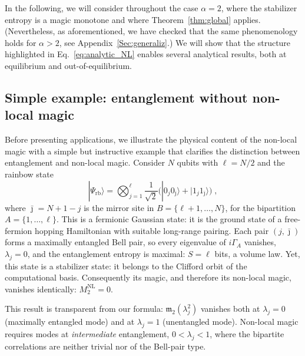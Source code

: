 \documentclass[prx,twocolumn,superscriptaddress,aps,10pt, frontmatterverbose, reprint,footinbib,longbibliography=true]{revtex4-2}
\newcommand{\RENYI}{\alpha}
\begin{document}
In the following, we will consider throughout the case $\RENYI=2$, where the stabilizer entropy is a magic monotone and where Theorem~\ref{thm:global} applies. (Nevertheless, as aforementioned, we have checked that the same phenomenology holds for $\RENYI>2$, see Appendix~\ref{Sec:generaliz}.)
We will show that the structure highlighted in Eq.~\eqref{eq:analytic_NL} enables several analytical results, both at equilibrium and out-of-equilibrium.


\subsection{Simple example: entanglement without non-local magic}
\label{sec:simple}
Before presenting applications, we illustrate the physical content of the non-local magic with a simple but instructive example that clarifies the distinction between entanglement and non-local magic.
Consider $N$ qubits with $\ell = N/2$ and the rainbow state
\begin{equation}
    |\Psi_{\mathrm{rb}}\rangle = \bigotimes_{j=1}^{\ell} \frac{1}{\sqrt{2}}\bigl(|0_j 0_{\bar\jmath}\rangle + |1_j 1_{\bar\jmath}\rangle\bigr)\;,
\end{equation}
where $\bar\jmath = N+1-j$ is the mirror site in $B=\{\ell+1,\dots,N\}$, for the bipartition $A=\{1,\dots,\ell\}$. This is a fermionic Gaussian state: it is the ground state of a free-fermion hopping Hamiltonian with suitable long-range pairing. Each pair $(j,\bar\jmath)$ forms a maximally entangled Bell pair, so every eigenvalue of $i\Gamma_A$ vanishes, $\lambda_j = 0$, and the entanglement entropy is maximal: $S = \ell$ bits, a volume law. Yet, this state is a stabilizer state: it belongs to the Clifford orbit of the computational basis. Consequently its magic, and therefore its non-local magic, vanishes identically: $M_2^{\mathrm{NL}} = 0$.

This result is transparent from our formula: $\mathfrak{m}_2(\lambda_j^2)$ vanishes both at $\lambda_j = 0$  (maximally entangled mode) and at $\lambda_j = 1$  (unentangled mode). Non-local magic requires modes at \emph{intermediate} entanglement, $0 < \lambda_j < 1$, where the bipartite correlations are neither trivial nor of the Bell-pair type.
\end{document}
